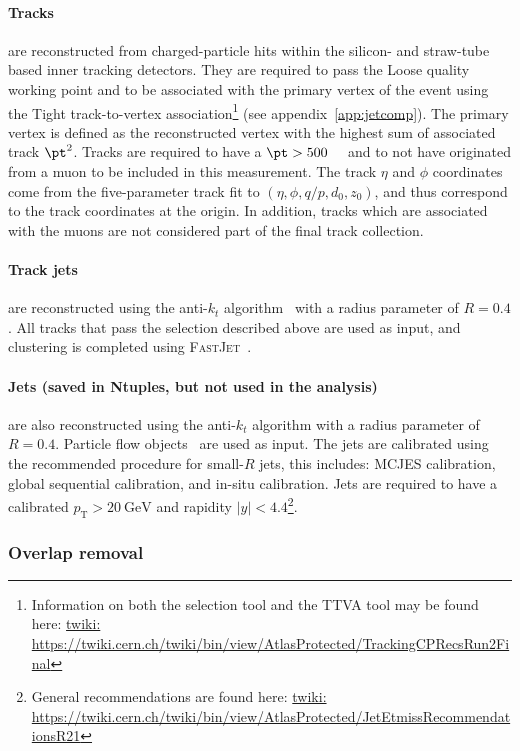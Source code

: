 \paragraph{Tracks} are reconstructed from charged-particle hits within the silicon- and straw-tube based inner tracking detectors. They are required to pass the Loose quality working point and to be associated with the primary vertex of the event using the Tight track-to-vertex association\footnote{Information on both the selection tool and the TTVA tool may be found here: \url{twiki: https://twiki.cern.ch/twiki/bin/view/AtlasProtected/TrackingCPRecsRun2Final}} (see appendix~\ref{app:jetcomp}).
The primary vertex is defined as the reconstructed vertex with the highest sum of associated track $\pt^2$. Tracks are required to have a $\pt>500$~\MeV~ and to not have originated from a muon to be included in this measurement.  The track $\eta$ and $\phi$ coordinates come from the five-parameter track fit to $(\eta,\phi,q/p,d_0,z_0)$, and thus correspond to the track coordinates at the origin.
In addition, tracks which are associated with the muons are not considered part of the final track collection.

\paragraph{Track jets} are reconstructed using the anti-$k_t$ algorithm~\cite{Cacciari:2008gp} with a radius parameter of $R=0.4$. All tracks that pass the selection described above are used as input, and clustering is completed using \textsc{FastJet}~\cite{Cacciari:2011ma}.

\paragraph{Jets (saved in Ntuples, but not used in the analysis)} are also reconstructed using the anti-$k_t$ algorithm with a radius parameter of $R=0.4$. Particle flow objects~\cite{Aaboud:2017aca} are used as input. The jets are calibrated using the recommended procedure for small-$R$ jets, this includes: MCJES calibration, global sequential calibration, and in-situ calibration.
Jets are required to have a calibrated $p_\text{T} > 20~\text{GeV}$ and rapidity $|y| < 4.4$\footnote{General recommendations are found here: \url{twiki: https://twiki.cern.ch/twiki/bin/view/AtlasProtected/JetEtmissRecommendationsR21}}.

\subsubsection{Overlap removal}

